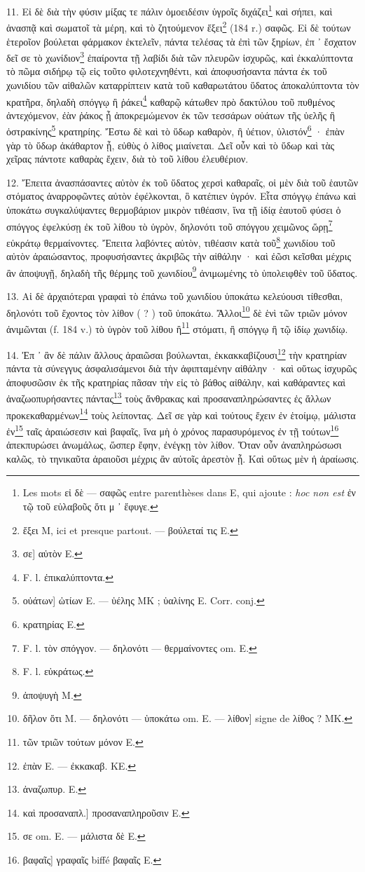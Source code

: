 \documentclass[a4paper, 11pt, oneside, polutonikogreek, french]{article}
\begin{document}
11. Εἰ δὲ διὰ τὴν φύσιν μίξας τε πάλιν ὁμοειδέσιν ὑγροῖς διχάζει\footnote{Les mots εἰ δὲ --- σαφῶς entre parenthèses dans E, qui ajoute : \emph{hoc non est} ἐν τῷ τοῦ εὐλαβοῦς ὅτι μ ᾽ ἔφυγε.} καὶ σήπει, καὶ ἀνασπᾷ καὶ σωματοῖ τὰ μέρη, καὶ τὸ ζητούμενον ἕξει\footnote{ἔξει M, ici et presque partout. --- βούλεταί τις E.} (184 r.) σαφῶς. Εἰ δὲ τούτων ἑτεροῖον βούλεται φάρμακον ἐκτελεῖν, πάντα τελέσας τὰ ἐπὶ τῶν ξηρίων, ἐπ ᾽ ἔσχατον δεῖ σε τὸ χωνίδιον\footnote{σε] αὐτὸν E.} ἐπαίροντα τῇ λαβίδι διὰ τῶν πλευρῶν ἰσχυρῶς, καὶ ἐκκαλύπτοντα τὸ πῶμα σιδήρῳ τῷ εἰς τοῦτο φιλοτεχνηθέντι, καὶ ἀποφυσήσαντα πάντα ἐκ τοῦ χωνιδίου τῶν αἰθαλῶν καταρρίπτειν κατὰ τοῦ καθαρωτάτου ὕδατος ἀποκαλύπτοντα τὸν κρατῆρα, δηλαδὴ σπόγγῳ ἢ ῥάκει\footnote{F. l. ἐπικαλύπτοντα.} καθαρῷ κάτωθεν πρὸ δακτύλου τοῦ πυθμένος ἀντεχόμενον, ἐὰν ῥάκος ᾖ ἀποκρεμώμενον ἐκ τῶν τεσσάρων οὐάτων τῆς ὑελῆς ἢ ὀστρακίνης\footnote{οὐάτων] ὠτίων E. --- ὑέλης MK ; ὑαλίνης E. Corr. conj.} κρατηρίης. Ἔστω δὲ καὶ τὸ ὕδωρ καθαρὸν, ἢ ὑέτιον, ὑλιστόν\footnote{κρατηρίας E.} · ἐπὰν γὰρ τὸ ὕδωρ ἀκάθαρτον ᾖ, εὐθὺς ὁ λίθος μιαίνεται. Δεῖ οὖν καὶ τὸ ὕδωρ καὶ τὰς χεῖρας πάντοτε καθαρὰς ἔχειν, διὰ τὸ τοῦ λίθου ἐλευθέριον.

12. Ἔπειτα ἀνασπάσαντες αὐτὸν ἐκ τοῦ ὕδατος χερσὶ καθαραῖς, οἱ μὲν διὰ τοῦ ἑαυτῶν στόματος ἀναρροφῶντες αὐτὸν ἐφέλκονται, ὃ κατέπιεν ὑγρόν. Εἶτα σπόγγῳ ἐπάνω καὶ ὑποκάτω συγκαλύψαντες θερμοβάριον μικρὸν τιθέασιν, ἵνα τῇ ἰδίᾳ ἑαυτοῦ φύσει ὁ σπόγγος ἐφελκύσῃ ἐκ τοῦ λίθου τὸ ὑγρὸν, δηλονότι τοῦ σπόγγου χειμῶνος ὥρῃ\footnote{F. l. τὸν σπόγγον. --- δηλονότι --- θερμαίνοντες om. E.} εὐκράτῳ θερμαίνοντες. Ἔπειτα λαβόντες αὐτὸν, τιθέασιν κατὰ τοῦ\footnote{F. l. εὐκράτως.} χωνιδίου τοῦ αὐτὸν ἀραιώσαντος, προφυσήσαντες ἀκριβῶς τὴν αἰθάλην · καὶ ἐῶσι κεῖσθαι μέχρις ἂν ἀποψυγῇ, δηλαδὴ τῆς θέρμης τοῦ χωνιδίου\footnote{ἀποψυγὴ M.} ἀνιμωμένης τὸ ὑπολειφθὲν τοῦ ὕδατος.

13. Αἱ δὲ ἀρχαιότεραι γραφαὶ τὸ ἐπάνω τοῦ χωνιδίου ὑποκάτω κελεύουσι τίθεσθαι, δηλονότι τοῦ ἔχοντος τὸν λίθον ( ? ) τοῦ ὑποκάτω. Ἄλλοι\footnote{δῆλον ὅτι M. --- δηλονότι --- ὑποκάτω om. E. --- λίθον] signe de λίθος ? MK.} δὲ ἑνὶ τῶν τριῶν μόνον ἀνιμῶνται (f. 184 v.) τὸ ὑγρὸν τοῦ λίθου ἢ\footnote{τῶν τριῶν τούτων μόνον E.} στόματι, ἢ σπόγγῳ ἢ τῷ ἰδίῳ χωνιδίῳ.

14. Ἐπ ᾽ ἂν δὲ πάλιν ἄλλους ἀραιῶσαι βούλωνται, ἐκκακκαβίζουσι\footnote{ἐπὰν E. --- ἐκκακαβ. KE.} τὴν κρατηρίαν πάντα τὰ σύνεγγυς ἀσφαλισάμενοι διὰ τὴν ἀφιπταμένην αἰθάλην · καὶ οὕτως ἰσχυρῶς ἀποφυσῶσιν ἐκ τῆς κρατηρίας πᾶσαν τὴν εἰς τὸ βάθος αἰθάλην, καὶ καθάραντες καὶ ἀναζωοπυρήσαντες πάντας\footnote{ἀναζωπυρ. E.} τοὺς ἄνθρακας καὶ προσαναπληρώσαντες ἐς ἄλλων προκεκαθαρμένων\footnote{καὶ προσαναπλ.] προσαναπληροῦσιν E.} τοὺς λείποντας. Δεῖ σε γὰρ καὶ τούτους ἔχειν ἐν ἑτοίμῳ, μάλιστα ἐν\footnote{σε om. E. --- μάλιστα δὲ E.} ταῖς ἀραιώσεσιν καὶ βαφαῖς, ἵνα μὴ ὁ χρόνος παρασυρόμενος ἐν τῇ τούτων\footnote{βαφαῖς] γραφαῖς biffé βαφαῖς E.} ἀπεκπυρώσει ἀνωμάλως, ὥσπερ ἔφην, ἐνέγκῃ τὸν λίθον. Ὅταν οὖν ἀναπληρώσωσι καλῶς, τὸ τηνικαῦτα ἀραιοῦσι μέχρις ἂν αὐτοῖς ἀρεστὸν ᾖ. Καὶ οὕτως μὲν ἡ ἀραίωσις.
\end{document}
